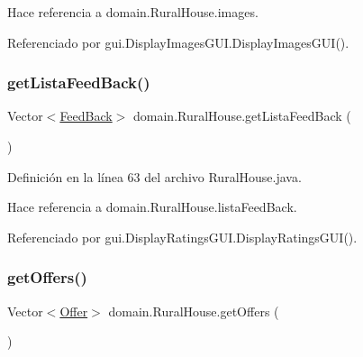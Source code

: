 Hace referencia a domain.\+Rural\+House.\+images.



Referenciado por gui.\+Display\+Images\+G\+U\+I.\+Display\+Images\+G\+U\+I().

\mbox{\label{classdomain_1_1_rural_house_a2d672423144d413d9f4b94b9676af0b1}} 
\subsubsection{\texorpdfstring{getListaFeedBack()}{getListaFeedBack()}}
{\footnotesize\ttfamily Vector$<$\mbox{\hyperlink{classdomain_1_1_feed_back}{Feed\+Back}}$>$ domain.\+Rural\+House.\+get\+Lista\+Feed\+Back (\begin{DoxyParamCaption}{ }\end{DoxyParamCaption})}



Definición en la línea 63 del archivo Rural\+House.\+java.


\begin{DoxyCode}{0}

\end{DoxyCode}


Hace referencia a domain.\+Rural\+House.\+lista\+Feed\+Back.



Referenciado por gui.\+Display\+Ratings\+G\+U\+I.\+Display\+Ratings\+G\+U\+I().

\mbox{\label{classdomain_1_1_rural_house_ae653409c7556fa8b3ccabd0c17604666}} 
\subsubsection{\texorpdfstring{getOffers()}{getOffers()}\hspace{0.1cm}{\footnotesize\ttfamily [1/2]}}
{\footnotesize\ttfamily Vector$<$\mbox{\hyperlink{classdomain_1_1_offer}{Offer}}$>$ domain.\+Rural\+House.\+get\+Offers (\begin{DoxyParamCaption}{ }\end{DoxyParamCaption})}



